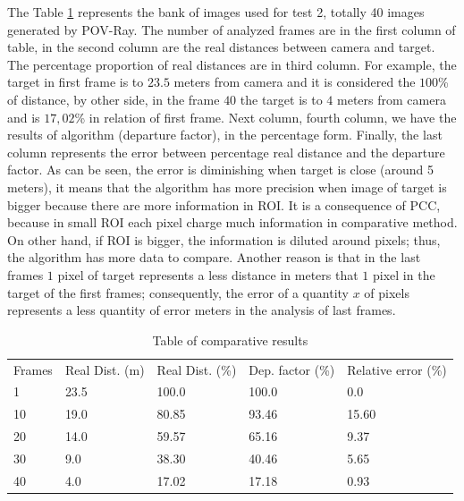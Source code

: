 The Table \ref{tab:tab1} represents the bank of images used for test 2, totally 40 images generated by POV-Ray.
The number of analyzed frames are in the first column of table, in the second column are the real distances 
between camera and target.
The percentage proportion of real distances are in third column. For example, 
the target in first frame is to $23.5$ meters from camera and it is considered the $100$\% of distance,
by other side, in the frame $40$ the target is to $4$ meters 
from camera and is $17,02$\% in relation of first frame. Next column, fourth column, 
we have the results of algorithm (departure factor), in the percentage form. 
Finally, the last column represents the error between percentage real distance and the departure factor. 
As can be seen, the error is diminishing when target is close (around 5 meters), it means that the algorithm has more precision 
when image of target is bigger because there are more information in ROI. It is a consequence of PCC, 
because in small ROI each pixel charge much information in comparative method. On other hand, if ROI is bigger,
the information is diluted around pixels; thus, the algorithm has more data to compare.
Another reason is that in the last frames $1$ pixel of target
represents a less distance in meters that $1$ pixel in the target of the first frames; consequently, the error 
of a quantity $x$ of pixels represents a less quantity of error meters in the analysis of last frames.

\begin{table}[H]
\setlength{\tabcolsep}{1 pt} 
\caption{Table of comparative results}
\begin{tabular}{lllll}
Frames & Real Dist. (m) & Real Dist. (\%) & Dep. factor (\%) & Relative error (\%)\\
1 & 23.5 & 100.0 & 100.0 & 0.0 \\
10 & 19.0 & 80.85 & 93.46 & 15.60 \\
20 & 14.0 & 59.57 & 65.16 & 9.37 \\
30 & 9.0 & 38.30 & 40.46 & 5.65 \\
40 & 4.0 & 17.02 & 17.18 & 0.93
\end{tabular}
\label{tab:tab1}
\end{table}


